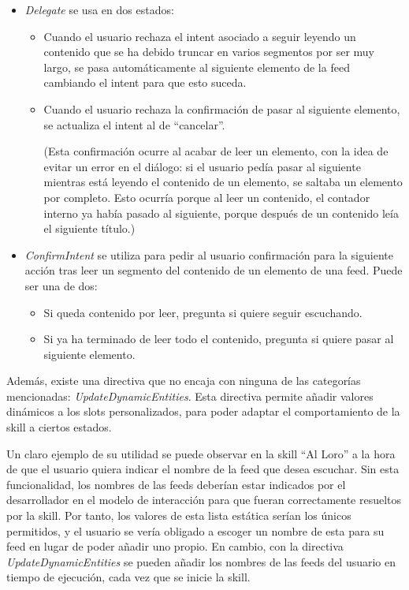 \documentclass[11pt,spanish,listoffigures,listoftables,table,hyphens,dvipsnames]{tfgetsinf}
\begin{document}
\begin{itemize}
   \item \emph{Delegate} se usa en dos estados:
   \begin{itemize}
      \item Cuando el usuario rechaza el intent asociado a seguir leyendo un contenido que se ha debido truncar en varios segmentos por ser muy largo, se pasa automáticamente al siguiente elemento de la feed cambiando el intent para que esto suceda.
      \item Cuando el usuario rechaza la confirmación de pasar al siguiente elemento, se actualiza el intent al de ``cancelar''.
      
      (Esta confirmación ocurre al acabar de leer un elemento, con la idea de evitar un error en el diálogo: si el usuario pedía pasar al siguiente mientras está leyendo el contenido de un elemento, se saltaba un elemento por completo. Esto ocurría porque al leer un contenido, el contador interno ya había pasado al siguiente, porque después de un contenido leía el siguiente título.)
   \end{itemize}
   \item \emph{ConfirmIntent} se utiliza para pedir al usuario confirmación para la siguiente acción tras leer un segmento del contenido de un elemento de una feed. Puede ser una de dos:
   \begin{itemize}
      \item Si queda contenido por leer, pregunta si quiere seguir escuchando.
      \item Si ya ha terminado de leer todo el contenido, pregunta si quiere pasar al siguiente elemento.
   \end{itemize}
\end{itemize}

Además, existe una directiva que no encaja con ninguna de las categorías mencionadas: \emph{UpdateDynamicEntities}. Esta directiva permite añadir valores dinámicos a los slots personalizados, para poder adaptar el comportamiento de la skill a ciertos estados.

Un claro ejemplo de su utilidad se puede observar en la skill ``Al Loro'' a la hora de que el usuario quiera indicar el nombre de la feed que desea escuchar. Sin esta funcionalidad, los nombres de las feeds deberían estar indicados por el desarrollador en el modelo de interacción para que fueran correctamente resueltos por la skill. Por tanto, los valores de esta lista estática serían los únicos permitidos, y el usuario se vería obligado a escoger un nombre de esta para su feed en lugar de poder añadir uno propio. En cambio, con la directiva \emph{UpdateDynamicEntities} se pueden añadir los nombres de las feeds del usuario en tiempo de ejecución, cada vez que se inicie la skill.
\end{document}

